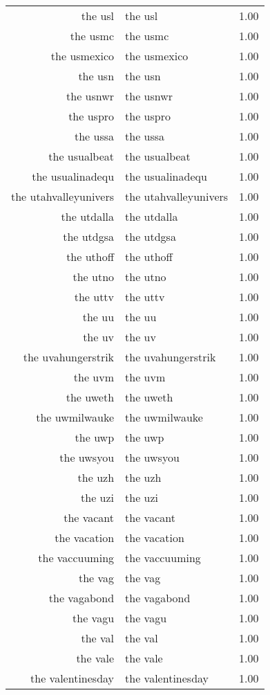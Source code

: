 \begin{table}[ht]
\begin{tabular}{rlr}
  the usl & the usl & 1.00 \\ 
  the usmc & the usmc & 1.00 \\ 
  the usmexico & the usmexico & 1.00 \\ 
  the usn & the usn & 1.00 \\ 
  the usnwr & the usnwr & 1.00 \\ 
  the uspro & the uspro & 1.00 \\ 
  the ussa & the ussa & 1.00 \\ 
  the usualbeat & the usualbeat & 1.00 \\ 
  the usualinadequ & the usualinadequ & 1.00 \\ 
  the utahvalleyunivers & the utahvalleyunivers & 1.00 \\ 
  the utdalla & the utdalla & 1.00 \\ 
  the utdgsa & the utdgsa & 1.00 \\ 
  the uthoff & the uthoff & 1.00 \\ 
  the utno & the utno & 1.00 \\ 
  the uttv & the uttv & 1.00 \\ 
  the uu & the uu & 1.00 \\ 
  the uv & the uv & 1.00 \\ 
  the uvahungerstrik & the uvahungerstrik & 1.00 \\ 
  the uvm & the uvm & 1.00 \\ 
  the uweth & the uweth & 1.00 \\ 
  the uwmilwauke & the uwmilwauke & 1.00 \\ 
  the uwp & the uwp & 1.00 \\ 
  the uwsyou & the uwsyou & 1.00 \\ 
  the uzh & the uzh & 1.00 \\ 
  the uzi & the uzi & 1.00 \\ 
  the vacant & the vacant & 1.00 \\ 
  the vacation & the vacation & 1.00 \\ 
  the vaccuuming & the vaccuuming & 1.00 \\ 
  the vag & the vag & 1.00 \\ 
  the vagabond & the vagabond & 1.00 \\ 
  the vagu & the vagu & 1.00 \\ 
  the val & the val & 1.00 \\ 
  the vale & the vale & 1.00 \\ 
  the valentinesday & the valentinesday & 1.00 \\ 

\end{tabular}
\end{table}
